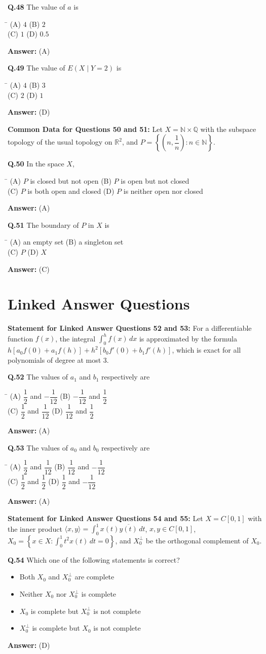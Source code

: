 \documentclass[11pt,a4paper]{article}
\newcommand{\optsfourA}[4]{%
  \begin{tabbing}
    \hspace{0.48\linewidth}\=\kill
    (A) #1 \> (B) #2 \\[2pt]
    (C) #3 \> (D) #4
  \end{tabbing}%
}
\newcommand{\optslistA}[4]{%
  \begin{itemize}
    \setlength{\itemsep}{2pt}\setlength{\parskip}{0pt}
    \item[(A)] #1
    \item[(B)] #2
    \item[(C)] #3
    \item[(D)] #4
  \end{itemize}%
}
\newcommand{\ans}[1]{\textbf{Answer:} #1\par\medskip}
\begin{document}
\textbf{Q.48} The value of $a$ is
\optsfourA{$4$}{$2$}{$1$}{$0.5$}
\ans{(A)}

\textbf{Q.49} The value of $E(X \mid Y = 2)$ is
\optsfourA{$4$}{$3$}{$2$}{$1$}
\ans{(D)}

\medskip
\textbf{Common Data for Questions 50 and 51:}
Let $X = \mathbb{N} \times \mathbb{Q}$ with the subspace topology of the usual topology on $\mathbb{R}^2$, and $P = \left\{\left(n, \dfrac{1}{n}\right) : n \in \mathbb{N}\right\}$.

\textbf{Q.50} In the space $X$,
\optsfourA{$P$ is closed but not open}{$P$ is open but not closed}{$P$ is both open and closed}{$P$ is neither open nor closed}
\ans{(A)}

\textbf{Q.51} The boundary of $P$ in $X$ is
\optsfourA{an empty set}{a singleton set}{$P$}{$X$}
\ans{(C)}

\section*{Linked Answer Questions}

\textbf{Statement for Linked Answer Questions 52 and 53:}
For a differentiable function $f(x)$, the integral $\displaystyle\int_0^h f(x)\,dx$ is approximated by the formula $h[a_0 f(0) + a_1 f(h)] + h^2[b_0 f'(0) + b_1 f'(h)]$, which is exact for all polynomials of degree at most $3$.

\textbf{Q.52} The values of $a_1$ and $b_1$ respectively are
\optsfourA{$\dfrac{1}{2}$ and $-\dfrac{1}{12}$}{$-\dfrac{1}{12}$ and $\dfrac{1}{2}$}{$\dfrac{1}{2}$ and $\dfrac{1}{12}$}{$\dfrac{1}{12}$ and $\dfrac{1}{2}$}
\ans{(A)}

\textbf{Q.53} The values of $a_0$ and $b_0$ respectively are
\optsfourA{$\dfrac{1}{2}$ and $\dfrac{1}{12}$}{$\dfrac{1}{12}$ and $-\dfrac{1}{12}$}{$\dfrac{1}{2}$ and $\dfrac{1}{2}$}{$\dfrac{1}{2}$ and $-\dfrac{1}{12}$}
\ans{(A)}

\medskip
\textbf{Statement for Linked Answer Questions 54 and 55:}
Let $X = C[0, 1]$ with the inner product $\langle x, y \rangle = \displaystyle\int_0^1 x(t)\overline{y(t)}\,dt$, $x, y \in C[0, 1]$, $X_0 = \left\{x \in X : \displaystyle\int_0^1 t^2 x(t)\,dt = 0\right\}$, and $X_0^\perp$ be the orthogonal complement of $X_0$.

\textbf{Q.54} Which one of the following statements is correct?
\optslistA{Both $X_0$ and $X_0^\perp$ are complete}{Neither $X_0$ nor $X_0^\perp$ is complete}{$X_0$ is complete but $X_0^\perp$ is not complete}{$X_0^\perp$ is complete but $X_0$ is not complete}
\ans{(D)}
\end{document}
